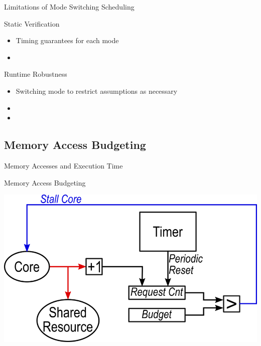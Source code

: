\begin{frame}{Limitations of Mode Switching Scheduling}

\pause
\begin{block}{Static Verification}
\begin{itemize}
    \item<3-> Timing guarantees for each mode
    \item<4-> 
\end{itemize}
\end{block}

\begin{block}{Runtime Robustness}
\begin{itemize}
    \item<5-> Switching mode to restrict assumptions as necessary
    \item<6-> 
    \item<7-> 
\end{itemize}
\end{block}

\end{frame}


\subsection{Memory Access Budgeting}

\begin{frame}{Memory Accesses and Execution Time}

\end{frame}

\begin{frame}{Memory Access Budgeting}

\includegraphics[width=\textwidth]{Figures/budgeting-robin}

\end{frame}


